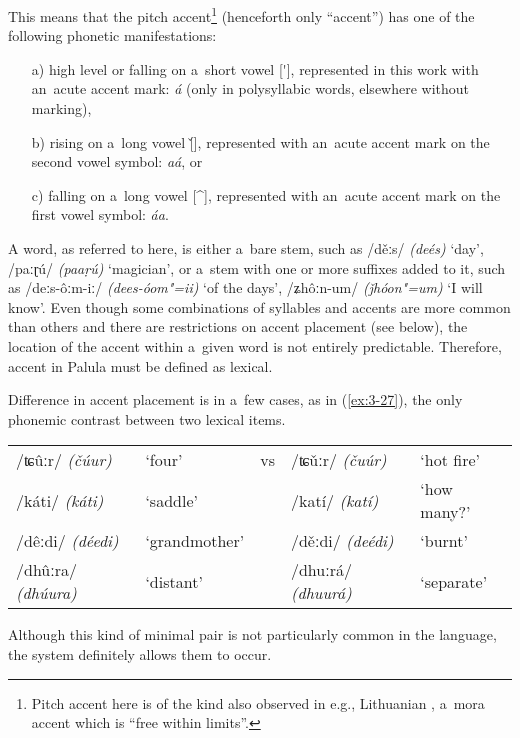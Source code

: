 This means that the pitch accent\footnote{Pitch accent here is of the kind also observed in e.g., Lithuanian \citep[73--82]{szemerenyi1996}, a~mora accent which is ``free within limits''.} (henceforth only ``accent'') has one of the following phonetic manifestations:
\begin{enumerate}
\item[a)] high level or falling on a~short vowel [\'{}], represented in this work with an~acute accent mark: \textit{á} (only in polysyllabic words, elsewhere without marking), 
\item[b)] rising on a~long vowel [\v{}], represented with an~acute accent mark on the second vowel symbol: \textit{aá}, or 
\item[c)] falling on a~long vowel [\^{}], represented with an~acute accent mark on the first vowel symbol: \textit{áa}.
\end{enumerate}
A word, as referred to here, is either a~bare stem, such as /děːs/ \textit{(deés)} `day', /paːɽú/ \textit{(paaṛú)} `magician', or a~stem with one or more suffixes added to it, such as /deːs-ôːm-iː/ \textit{(dees-óom"=ii)} `of the days', /ʑhôːn-um/ \textit{(ǰhóon"=um)} `I will know'. Even though some combinations of syllables and accents are more common than others and there are restrictions on accent placement (see below), the location of the accent within a~given word is not entirely predictable. Therefore, accent in Palula must be defined as lexical. 


Difference in accent placement is in a~few cases, as in (\ref{ex:3-27}), the only phonemic contrast between two lexical items.


\begin{exe}
\extab
\label{ex:3-27}
\begin{tabularx}{116mm}{ l l l l l }
/ʨûːr/ \textit{(čúur)} &
`four' &
vs &
/ʨǔːr/ \textit{(čuúr)} &
`hot fire'\\
/káti/ \textit{(káti)} &
`saddle' &
&
/katí/ \textit{(katí)} &
`how many?'\\
/dêːdi/ \textit{(déedi)} &
`grandmother' &
&
/děːdi/ \textit{(deédi)} &
`burnt'\\
/dhûːra/ \textit{(dhúura)} &
`distant' &
&
/dhuːrá/ \textit{(dhuurá)} &
`separate'\\
\end{tabularx}
\end{exe}

Although this kind of minimal pair is not particularly common in the language, the system definitely allows them to occur.

